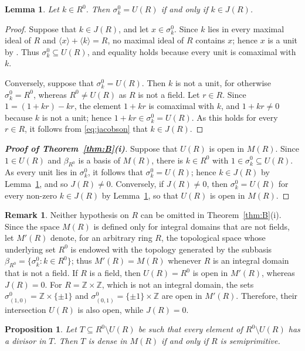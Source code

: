 \documentclass[12pt,reqno,a4paper]{amsart}
\newcommand{\Z}{\mathbb{Z}}
\theoremstyle{plain}
\newtheorem{proposition}[theorem]{Proposition}
\newtheorem{lemma}[theorem]{Lemma}
\theoremstyle{definition}
\newtheorem{remark}[theorem]{Remark}
\begin{document}
\begin{lemma}\label{lem:sigmaJ}
Let $k\in R^0$. Then $\sigma_k^0=U(R)$ if and only if $k\in J(R)$.
\end{lemma}
\begin{proof}
Suppose that $k\in J(R)$, and let $x\in\sigma_k^0$. Since $k$ lies in every maximal ideal of $R$ and $\langle x\rangle+\langle k\rangle=R$, no maximal ideal of $R$ contains $x$; hence $x$ is a unit by \cite[Corollary~1.4]{AtiyahMacdonald}. Thus $\sigma_k^0\subseteq U(R)$, and equality holds because every unit is comaximal with $k$. 

Conversely, suppose that $\sigma_k^0=U(R)$. Then $k$ is not a unit, for otherwise $\sigma_k^0=R^0$, whereas $R^0\neq U(R)$ as $R$ is not a field. Let $r\in R$. Since $1=(1+kr)-kr$, the element $1+kr$ is comaximal with $k$, and $1+kr\neq0$ because $k$ is not a unit; hence $1+kr\in\sigma_k^0=U(R)$. As this holds for every $r\in R$, it follows from \eqref{eq:jacobson} that $k\in J(R)$.
\end{proof}
\begin{proof}[\normalfont\bfseries Proof of Theorem~\ref{thm:B}(i)]
Suppose that $U(R)$ is open in $M(R)$. Since $1\in U(R)$ and $\beta_{R^0}$ is a basis of $M(R)$, there is $k\in R^0$ with $1\in\sigma_k^0\subseteq U(R)$. As every unit lies in $\sigma_k^0$, it follows that $\sigma_k^0=U(R)$; hence $k\in J(R)$ by Lemma~\ref{lem:sigmaJ}, and so $J(R)\neq0$. Conversely, if $J(R)\neq0$, then $\sigma_k^0=U(R)$ for every non-zero $k\in J(R)$ by Lemma~\ref{lem:sigmaJ}, so that $U(R)$ is open in $M(R)$.
\end{proof}
\begin{remark}\label{rem:jacobson}
Neither hypothesis on $R$ can be omitted in Theorem~\ref{thm:B}(i). Since the space $M(R)$ is defined only for integral domains that are not fields, let $M'(R)$ denote, for an arbitrary ring $R$, the topological space whose underlying set $R^0$ is endowed with the topology generated by the subbasis $\beta_{R^0}=\{\sigma_k^0:k\in R^0\}$; thus $M'(R)=M(R)$ whenever $R$ is an integral domain that is not a field. If $R$ is a field, then $U(R)=R^0$ is open in $M'(R)$, whereas $J(R)=0$. For $R=\Z\times\Z$, which is not an integral domain, the sets $\sigma^0_{(1,0)}=\Z\times\{\pm1\}$ and $\sigma^0_{(0,1)}=\{\pm1\}\times\Z$ are open in $M'(R)$. Therefore, their intersection $U(R)$ is also open, while $J(R)=0$.
\end{remark}
\begin{proposition}\label{prop:density}
Let $T\subseteq R^0\setminus U(R)$ be such that every element of $R^0\setminus U(R)$ has a divisor in $T$. Then $T$ is dense in $M(R)$ if and only if $R$ is semiprimitive.
\end{proposition}
\end{document}
